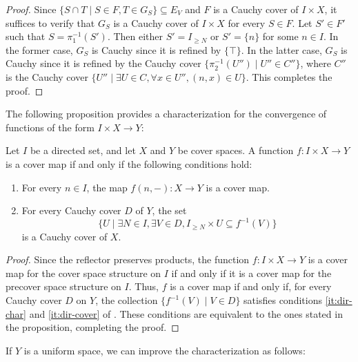 \documentclass[pdflatex,sn-mathphys-num]{sn-jnl}
\theoremstyle{definition}
\theoremstyle{remark}
\numberwithin{figure}{section}
\begin{document}
\begin{proof}
Since $\{ S \cap T \mid S \in F, T \in G_S \} \subseteq E_V$ and $F$ is a Cauchy cover of $I \times X$,
it suffices to verify that $G_S$ is a Cauchy cover of $I \times X$ for every $S \in F$.
Let $S' \in F'$ such that $S = \pi_1^{-1}(S')$.
Then either $S' = I_{\geq N}$ or $S' = \{ n \}$ for some $n \in I$.
In the former case, $G_S$ is Cauchy since it is refined by $\{ \top \}$.
In the latter case, $G_S$ is Cauchy since it is refined by the Cauchy cover $\{ \pi_2^{-1}(U'') \mid U'' \in C'' \}$,
where $C''$ is the Cauchy cover $\{ U'' \mid \exists U \in C, \forall x \in U'', (n,x) \in U \}$.
This completes the proof.
\end{proof}

The following proposition provides a characterization for the convergence of functions of the form $I \times X \to Y$:

\begin{prop}
Let $I$ be a directed set, and let $X$ and $Y$ be cover spaces.
A function $f : I \times X \to Y$ is a cover map if and only if the following conditions hold:
\begin{enumerate}
\item For every $n \in I$, the map $f(n, -) : X \to Y$ is a cover map.
\item For every Cauchy cover $D$ of $Y$, the set
        \[ \{ U \mid \exists N \in I, \exists V \in D, I_{\geq N} \times U \subseteq f^{-1}(V) \} \]
        is a Cauchy cover of $X$.
\end{enumerate}
\end{prop}
\begin{proof}
Since the reflector preserves products, the function $f : I \times X \to Y$ is a cover map for the cover space structure on $I$ if and only if it is a cover map for the precover space structure on $I$.
Thus, $f$ is a cover map if and only if, for every Cauchy cover $D$ on $Y$, the collection $\{ f^{-1}(V) \mid V \in D \}$ satisfies conditions \eqref{it:dir-char} and \eqref{it:dir-cover} of .
These conditions are equivalent to the ones stated in the proposition, completing the proof.
\end{proof}

If $Y$ is a uniform space, we can improve the characterization as follows:
\end{document}
